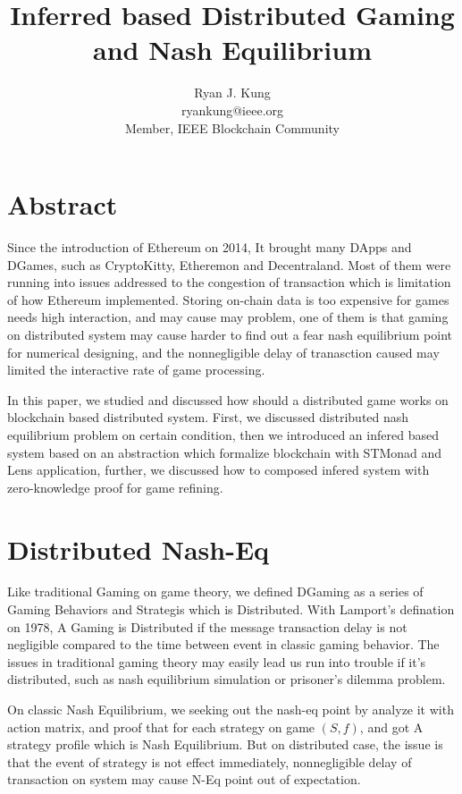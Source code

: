 \documentclass[twocolumn]{article}
\author{Ryan J. Kung \\ryankung@ieee.org\\Member, IEEE Blockchain Community }
\title{Inferred based Distributed Gaming and Nash Equilibrium}
\begin{document}
\maketitle
\section{Abstract}
Since the introduction of Ethereum on 2014\cite{ethereum}, It brought many DApps and DGames, such as CryptoKitty, Etheremon and Decentraland. Most of them were running into issues addressed to the congestion of transaction which is limitation of how Ethereum implemented. Storing on-chain data is too expensive for games needs high interaction, and may cause may problem, one of them is that gaming on distributed system may cause harder to find out a fear nash equilibrium point for numerical designing, and the nonnegligible delay of tranasction caused may limited the interactive rate of game processing.

In this paper, we studied and discussed how should a distributed game works on blockchain based distributed system. First, we discussed distributed nash equilibrium problem on certain condition, then we introduced an infered based system based on an abstraction which formalize blockchain with STMonad and Lens application, further, we discussed how to composed infered system with zero-knowledge proof for game refining.

\section{Distributed Nash-Eq}

Like traditional Gaming on game theory, we defined DGaming as a series of Gaming Behaviors and Strategis which is Distributed. With Lamport's defination on 1978\cite{time-clocks-ordering-events-distributed-system}, A Gaming is Distributed if the message transaction delay is not negligible compared to the time between event in classic gaming behavior. The issues in traditional gaming theory may easily lead us run into trouble if it's distributed, such as nash equilibrium simulation or prisoner's dilemma problem.

On classic Nash Equilibrium, we seeking out the nash-eq point by analyze it with action matrix, and proof that for each strategy on game $(S, f)$, and got A strategy profile which is Nash Equilibrium. But on distributed case, the issue is that the event of strategy is not effect immediately, nonnegligible delay of transaction on system may cause N-Eq point out of expectation.
\end{document}
